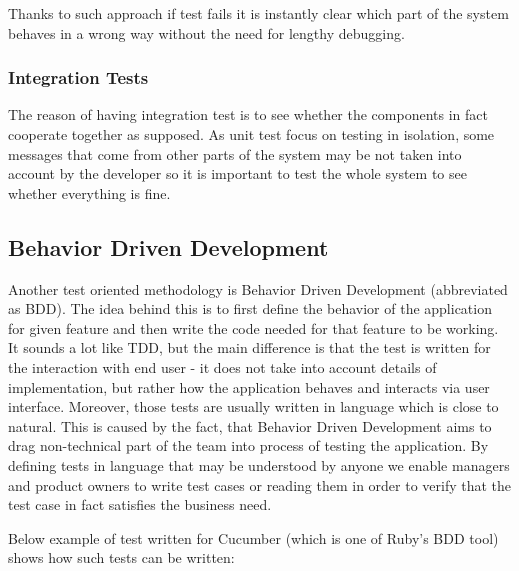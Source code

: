           
      
        Thanks to such approach if test fails it is instantly clear which part of the system behaves in a wrong way without
        the need for lengthy debugging.
      
      \subsubsection{Integration Tests}
        The reason of having integration test is to see whether the components in fact cooperate together as supposed.
        As unit test focus on testing in isolation, some messages that come from other parts of the system may be not
        taken into account by the developer so it is important to test the whole system to see whether everything is fine.
        
    \subsection{Behavior Driven Development}
      Another test oriented methodology is Behavior Driven Development (abbreviated as BDD). The idea behind this is to 
      first define the behavior of the application for given feature and then write the code needed for that feature to be working.
      It sounds a lot like TDD, but the main difference is that the test is written for the interaction with end user - it does not
      take into account details of implementation, but rather how the application behaves and interacts via user interface. Moreover,
      those tests are usually written in language which is close to natural. This is caused by the fact, that Behavior Driven
      Development aims to drag non-technical part of the team into process of testing the application. By defining tests in language
      that may be understood by anyone we enable managers and product owners to write test cases or reading them in order to 
      verify that the test case in fact satisfies the business need.
      
      Below example of test written for Cucumber (which is one of Ruby's BDD tool) shows how such tests can be written:
      
      
    
